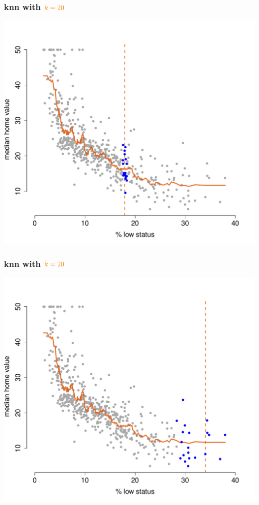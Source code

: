 \documentclass{beamer}
\newcommand{\bo}[1]{\textcolor{burntorange}{#1}}
\begin{document}
\begin{frame}[plain]
\frametitle{knn with $\bo{k=20}$}
\vspace{-8mm}
\begin{center}
\includegraphics[scale=.44]{DaveBostonplotk=20ii=5.pdf}
\end{center}
\end{frame}

\begin{frame}[plain]
\frametitle{knn with $\bo{k=20}$}
\vspace{-8mm}
\begin{center}
\includegraphics[scale=.44]{DaveBostonplotk=20ii=6.pdf}
\end{center}
\end{frame}
\end{document}
